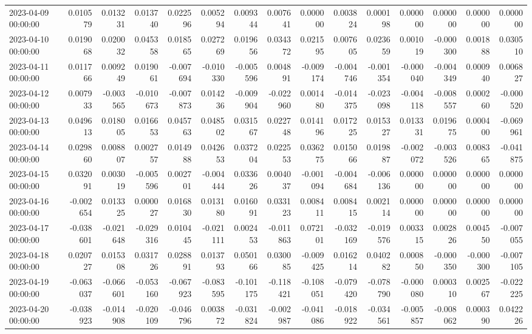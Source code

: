 \begin{tabular}{lrrrrrrrrrrrrrr}
2023-04-09 00:00:00 & 0.010579 & 0.013231 & 0.013740 & 0.022596 & 0.005294 & 0.009344 & 0.007641 & 0.000000 & 0.003824 & 0.000198 & 0.000000 & 0.000000 & 0.000000 & 0.000000 \\
2023-04-10 00:00:00 & 0.019068 & 0.020032 & 0.045358 & 0.018565 & 0.027269 & 0.019656 & 0.034372 & 0.021595 & 0.007605 & 0.023659 & 0.001019 & -0.000300 & 0.001888 & 0.030510 \\
2023-04-11 00:00:00 & 0.011766 & 0.009249 & 0.019061 & -0.007694 & -0.010330 & -0.005596 & 0.004891 & -0.009174 & -0.004746 & -0.001354 & -0.000040 & -0.004349 & 0.000940 & 0.006827 \\
2023-04-12 00:00:00 & 0.007933 & -0.003565 & -0.010673 & -0.007873 & 0.014236 & -0.009904 & -0.022960 & 0.001480 & -0.014375 & -0.023098 & -0.004118 & -0.008557 & 0.000260 & -0.000520 \\
2023-04-13 00:00:00 & 0.049613 & 0.018005 & 0.016653 & 0.045763 & 0.048502 & 0.031567 & 0.022748 & 0.014196 & 0.017225 & 0.015327 & 0.013331 & 0.019675 & 0.000400 & -0.069961 \\
2023-04-14 00:00:00 & 0.029860 & 0.008807 & 0.002757 & 0.014988 & 0.042653 & 0.037204 & 0.022553 & 0.036275 & 0.015066 & 0.019887 & -0.002072 & -0.003526 & 0.008365 & -0.041875 \\
2023-04-15 00:00:00 & 0.032091 & 0.003019 & -0.005596 & 0.002701 & -0.004444 & 0.033626 & 0.004037 & -0.001094 & -0.004684 & -0.006136 & 0.000000 & 0.000000 & 0.000000 & 0.000000 \\
2023-04-16 00:00:00 & -0.002654 & 0.013325 & 0.000027 & 0.016830 & 0.013180 & 0.016091 & 0.033123 & 0.008411 & 0.008415 & 0.002114 & 0.000000 & 0.000000 & 0.000000 & 0.000000 \\
2023-04-17 00:00:00 & -0.038601 & -0.021648 & -0.029316 & 0.010445 & -0.021111 & 0.002453 & -0.011863 & 0.072101 & -0.032169 & -0.019576 & 0.003315 & 0.002826 & 0.004550 & -0.007055 \\
2023-04-18 00:00:00 & 0.020727 & 0.015308 & 0.031726 & 0.028891 & 0.013793 & 0.050166 & 0.030085 & -0.009425 & 0.016214 & 0.040282 & 0.000850 & -0.000350 & -0.000300 & -0.007105 \\
2023-04-19 00:00:00 & -0.063037 & -0.066601 & -0.053160 & -0.067923 & -0.083595 & -0.101175 & -0.118421 & -0.108051 & -0.079420 & -0.078790 & -0.000080 & 0.000310 & 0.002567 & -0.022225 \\
2023-04-20 00:00:00 & -0.038923 & -0.014908 & -0.020109 & -0.046796 & 0.003872 & -0.031824 & -0.002987 & -0.041086 & -0.018922 & -0.034561 & -0.005857 & -0.008062 & 0.000390 & 0.042226 \\

\end{tabular}

